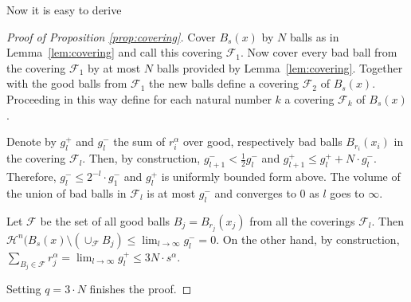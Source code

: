 \documentclass[12pt,leqno]{amsart}
\numberwithin{equation}{section}
\theoremstyle{definition}
\theoremstyle{remark}
\newcommand{\lref}[1]{Lemma~\ref{#1}}
\begin{document}
Now it is easy to derive
\begin{proof}[Proof of Proposition \ref{prop:covering}]
Cover $B_{s} (x)$ by $N$ balls as in \lref{lem:covering}  and call this covering $\mathcal F_1$.  Now cover every bad
 ball from the covering $\mathcal F_1$ by at most $N$ balls provided by  \lref{lem:covering}. Together with the good balls from $\mathcal F_1$ the new balls define a covering $\mathcal F_2$ of $B_s (x)$. Proceeding in this way define for each natural number $k$ a covering $\mathcal F_k$ of $B_s(x)$.

 Denote by $g_l^{+}$ and $g_l ^-$ the sum of $r_i ^{\alpha}$ over good, respectively bad balls $B_{r_i} (x_i)$ in the covering $\mathcal F_l$.
 Then, by construction, $g_{l+1} ^- < \frac 1 2 g_l ^-$ and $g_{l+1} ^+ \leq g_l ^+ + N\cdot g_l ^-$. Therefore, $g_l^- \leq  2^{-l} \cdot  g_1 ^-$
 and $g_l^+$ is uniformly bounded form above.
 The volume of the union of bad balls in $\mathcal F_l$ is at most $g_l^-$ and converges to $0$ as $l$ goes to $\infty$.

 Let  $\mathcal F$ be the set of all good balls $B_j =B_{r_j} (x_j)$ from all the  coverings $\mathcal F_l$.
   Then $\mathcal H^n (B_s (x) \setminus (\cup _{\mathcal F} B_j  )   \leq  \lim _{l\to \infty} g_l ^- =0$.  On the other hand,
   by construction, $\sum _{B_j\in \mathcal F} r_j^{\alpha} = \lim _{l\to \infty} g_l^+  \leq  3N \cdot s^{\alpha}$.
	
		Setting $q=3\cdot N$ finishes the proof.
\end{proof}
\end{document}
